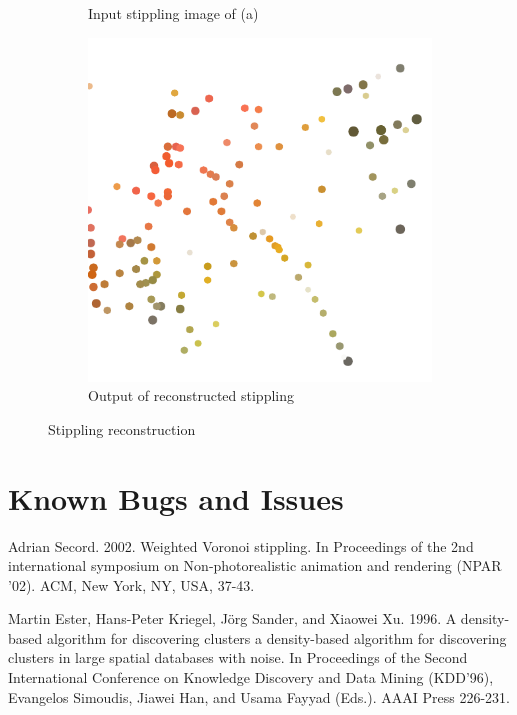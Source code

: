\documentclass[11pt]{article}
\begin{document}
\begin{figure}[H]
\begin{subfigure}{0.3\textwidth}
 \caption{Input stippling image of (a)}
    \end{subfigure}
    \begin{subfigure}{0.3\textwidth}
        \centering
        \includegraphics[width=\textwidth]{../results/hedcuter/C-1.pdf}
 \caption{Output of reconstructed stippling}
    \end{subfigure}
    \caption{Stippling reconstruction}
    \label{fig:rec}
\end{figure}

\section{Known Bugs and Issues}




\begin{thebibliography}{9}
Adrian Secord. 2002. Weighted Voronoi stippling. In Proceedings of the 2nd international symposium on Non-photorealistic animation and rendering (NPAR '02). ACM, New York, NY, USA, 37-43.

Martin Ester, Hans-Peter Kriegel, Jörg Sander, and Xiaowei Xu. 1996. A density-based algorithm for discovering clusters a density-based algorithm for discovering clusters in large spatial databases with noise. In Proceedings of the Second International Conference on Knowledge Discovery and Data Mining (KDD'96), Evangelos Simoudis, Jiawei Han, and Usama Fayyad (Eds.). AAAI Press 226-231.

\end{thebibliography}
\end{document}
